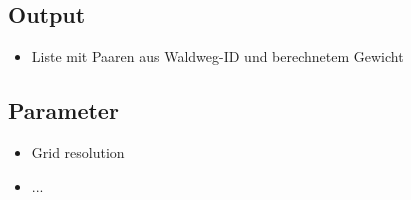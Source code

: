\documentclass[parskip=half,german]{scrartcl}
\begin{document}
    
\subsection*{Output}
     \begin{itemize}
      \item Liste mit Paaren aus Waldweg-ID und berechnetem Gewicht
     \end{itemize}


    
\subsection*{Parameter}
\begin{itemize}
 \item Grid resolution
 \item ...
\end{itemize}
      
      
  
\end{document}
